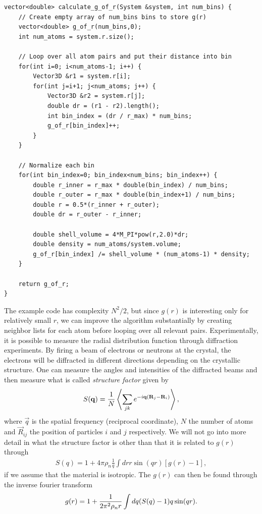 \begin{lstlisting}[caption=Calculation of $g(r)$., label=lst:g_of_r]
vector<double> calculate_g_of_r(System &system, int num_bins) {
    // Create empty array of num_bins bins to store g(r)
    vector<double> g_of_r(num_bins,0);
    int num_atoms = system.r.size();

    // Loop over all atom pairs and put their distance into bin
    for(int i=0; i<num_atoms-1; i++) {
        Vector3D &r1 = system.r[i];
        for(int j=i+1; j<num_atoms; j++) {
            Vector3D &r2 = system.r[j];
            double dr = (r1 - r2).length();
            int bin_index = (dr / r_max) * num_bins;
            g_of_r[bin_index]++;
        }
    }

    // Normalize each bin
    for(int bin_index=0; bin_index<num_bins; bin_index++) {
        double r_inner = r_max * double(bin_index) / num_bins;
        double r_outer = r_max * double(bin_index+1) / num_bins;
        double r = 0.5*(r_inner + r_outer);
        double dr = r_outer - r_inner;

        double shell_volume = 4*M_PI*pow(r,2.0)*dr;
        double density = num_atoms/system.volume;
        g_of_r[bin_index] /= shell_volume * (num_atoms-1) * density;
    }

    return g_of_r;
}
\end{lstlisting}
The example code has complexity $N^2/2$, but since $g(r)$ is interesting only for relatively small $r$, we can improve the algorithm substantially by creating neighbor lists for each atom before looping over all relevant pairs. Experimentally, it is possible to measure the radial distribution function through diffraction experiments. By firing a beam of electrons or neutrons at the crystal, the electrons will be diffracted in different directions depending on the crystallic structure. One can measure the angles and intensities of the diffracted beams and then measure what is called \textit{structure factor} given by
\begin{align}
    S(\vec q) = {1\over N}\left\langle \sum_{jk} e^{-i\vec q(\vec R_j - \vec R_i)}\right \rangle,
\end{align}
where $\vec q$ is the spatial frequency (reciprocal coordinate), $N$ the number of atoms and $\vec R_{ij}$ the position of particles $i$ and $j$ respectively. We will not go into more detail in what the structure factor is other than that it is related to $g(r)$ through
\begin{align}
    S(q) = 1 + 4\pi\rho_n\frac{1}{q}\int dr r\sin(qr)[g(r) - 1],
\end{align}
if we assume that the material is isotropic\cite{kittel1996introduction}. The $g(r)$ can then be found through the inverse fourier transform
\begin{align}
    g(r) = 1 + {1\over 2\pi^2\rho_n r} \int dq(S(q) - 1)q\sin(qr).
\end{align}

